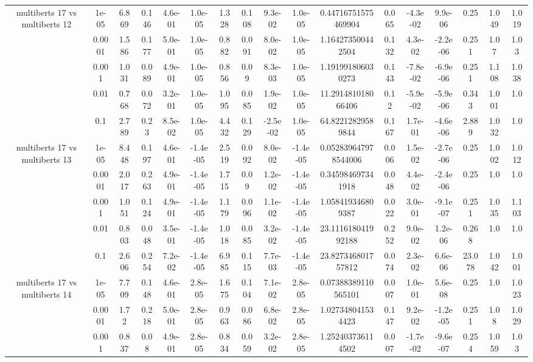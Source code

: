 \begin{tabular}{|c|c|c|c|c|c|c|c|c|c|c|c|c|c|c|c|c|}
\hline
\multirow{5}{*}{multiberts 17 vs multiberts 12} & 1e-05 & 6.869 & 0.146 & 4.6e-01 & 1.0e-05 & 1.328 & 0.108 & 9.3e-02 & 1.0e-05 & 0.44716751575469904 & 0.065 & -4.3e-02 & 9.9e-06 & 0.25 & 1.049 & 1.019 \\
 & 0.0001 & 1.586 & 0.177 & 5.0e-01 & 1.0e-05 & 0.882 & 0.091 & 8.0e-02 & 1.0e-05 & 1.164273500442504 & 0.132 & 4.3e-02 & -2.2e-06 & 0.251 & 1.07 & 1.03 \\
 & 0.001 & 1.031 & 0.089 & 4.9e-01 & 1.0e-05 & 0.856 & 0.09 & 8.3e-03 & 1.0e-05 & 1.191991806030273 & 0.143 & -7.8e-02 & -6.9e-06 & 0.251 & 1.108 & 1.038 \\
 & 0.01 & 0.768 & 0.072 & 3.2e-01 & 1.0e-05 & 1.095 & 0.085 & 1.9e-02 & 1.0e-05 & 11.291481018066406 & 0.12 & -5.9e-02 & -5.9e-06 & 0.343 & 1.001 & 1.0 \\
 & 0.1 & 2.789 & 0.23 & 8.5e-02 & 1.0e-05 & 4.432 & 0.129 & -2.5e-02 & 1.0e-05 & 64.82212829589844 & 0.167 & 1.7e-01 & -4.6e-06 & 2.889 & 1.032 & 1.0 \\
\hline
\multirow{5}{*}{multiberts 17 vs multiberts 13} & 1e-05 & 8.448 & 0.197 & 4.6e-01 & -1.4e-05 & 2.519 & 0.092 & 8.0e-02 & -1.4e-05 & 0.052839647978544006 & 0.006 & 1.5e-02 & -2.7e-06 & 0.25 & 1.002 & 1.012 \\
 & 0.0001 & 2.017 & 0.263 & 4.9e-01 & -1.4e-05 & 1.715 & 0.09 & 1.2e-02 & -1.4e-05 & 0.345984697341918 & 0.048 & 4.4e-02 & -2.4e-06 & 0.25 & 1.0 & 1.0 \\
 & 0.001 & 1.051 & 0.124 & 4.9e-01 & -1.4e-05 & 1.179 & 0.096 & 1.1e-02 & -1.4e-05 & 1.058419346809387 & 0.022 & 3.0e-01 & -9.1e-07 & 0.251 & 1.035 & 1.103 \\
 & 0.01 & 0.803 & 0.048 & 3.5e-01 & -1.4e-05 & 1.018 & 0.085 & 3.2e-02 & -1.4e-05 & 23.111618041992188 & 0.252 & 9.0e-02 & 1.2e-06 & 0.268 & 1.0 & 1.0 \\
 & 0.1 & 2.606 & 0.254 & 7.2e-02 & -1.4e-05 & 6.985 & 0.115 & 7.7e-03 & -1.4e-05 & 23.827346801757812 & 0.074 & 2.3e-02 & 6.6e-06 & 23.078 & 1.042 & 1.001 \\
\hline
\multirow{5}{*}{multiberts 17 vs multiberts 14} & 1e-05 & 7.709 & 0.148 & 4.6e-01 & 2.8e-05 & 1.675 & 0.104 & 7.1e-02 & 2.8e-05 & 0.07388389110565101 & 0.007 & 1.0e-01 & 5.6e-08 & 0.25 & 1.0 & 1.023 \\
 & 0.0001 & 1.72 & 0.218 & 5.0e-01 & 2.8e-05 & 0.963 & 0.086 & 6.8e-02 & 2.8e-05 & 1.027348041534423 & 0.147 & 9.2e-02 & -1.2e-05 & 0.251 & 1.08 & 1.029 \\
 & 0.001 & 0.837 & 0.08 & 4.9e-01 & 2.8e-05 & 0.834 & 0.059 & 3.2e-02 & 2.8e-05 & 1.252403736114502 & 0.007 & -1.7e-02 & -9.6e-07 & 0.254 & 1.059 & 1.03 \\

\end{tabular}
